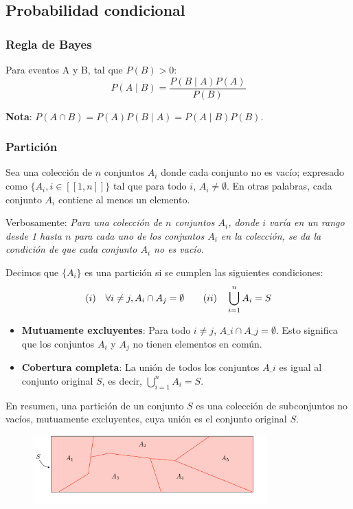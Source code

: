\subsection{Probabilidad condicional}
\subsubsection{Regla de Bayes}
Para eventos A y B, tal que $P(B)>0$:
$$P(A \mid B)=\frac{P(B \mid A)P(A)}{P(B)}$$

\textbf{Nota}: $P(A \cap B) = P(A)P(B \mid A) = P(A \mid B)P(B)$.

\subsubsection{Partición}
Sea una colección de $n$ conjuntos $A_i$ donde cada conjunto no es vacío; expresado como $\{A_i, i \in [[1, n]]\}$ tal que para todo $i$, $A_i \neq \emptyset$. En otras palabras, cada conjunto $A_i$ contiene al menos un elemento. 

Verbosamente: \textit{Para una colección de $n$ conjuntos $A_i$, donde $i$ varía en un rango desde 1 hasta $n$ para cada uno de los conjuntos $A_i$ en la colección, se da la condición de que cada conjunto $A_i$ no es vacío.}

Decimos que $\{A_i\}$ es una partición si se cumplen las siguientes condiciones:
$$\text(i)\quad\forall i \neq j, A_i \cap A_j = \emptyset \quad \quad \text(ii)\quad \bigcup_{i=1}^{n} A_i = S$$
\begin{itemize}
\item \textbf{Mutuamente excluyentes}: Para todo $i \neq j$, $A\_i \cap A\_j = \emptyset$. Esto significa que los conjuntos $A_{i}$ y $A_{j}$ no tienen elementos en común.
\item \textbf{Cobertura completa}: La unión de todos los conjuntos $A\_i$ es igual al conjunto original $S$, es decir, $\bigcup_{i=1}^{n} A_i = S$.
\end{itemize}

En resumen, una partición de un conjunto $S$ es una colección de subconjuntos no vacíos, mutuamente excluyentes, cuya unión es el conjunto original $S$.

\begin{figure}[h]
\centering
\includegraphics[width = 0.8\textwidth]{figs/partition.png}
\end{figure}

